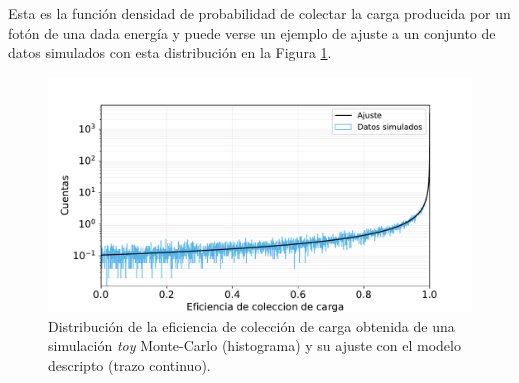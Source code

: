 Esta es la función densidad de probabilidad de colectar la carga producida por un fotón de una dada energía y puede verse un ejemplo de ajuste a un conjunto de datos simulados con esta distribución en la Figura \ref{fig:BetaDistyAjuste}.
\begin{figure}[h]
    \centering
        \includegraphics[scale=0.5]{Figs/BetaDistyAjuste.pdf}
    \caption{Distribución de la eficiencia de colección de carga obtenida de una simulación \textit{toy} Monte-Carlo (histograma) y su ajuste con el modelo descripto (trazo continuo).}
    \label{fig:BetaDistyAjuste}
\end{figure}

